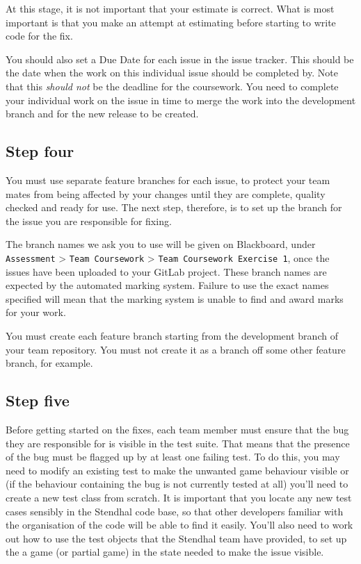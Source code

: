 \documentclass[
]{book}
\begin{document}
At this stage, it is not important that your estimate is correct. What is most important is that you make an attempt at estimating before starting to write code for the fix.

You should also set a Due Date for each issue in the issue tracker. This should be the date when the work on this individual issue should be completed by. Note that this \emph{should not} be the deadline for the coursework. You need to complete your individual work on the issue in time to merge the work into the development branch and for the new release to be created.

\hypertarget{stepfour}{%
\subsection{Step four}\label{stepfour}}

You must use separate feature branches for each issue, to protect your team mates from being affected by your changes until they are complete, quality checked and ready for use. The next step, therefore, is to set up the branch for the issue you are responsible for fixing.

The branch names we ask you to use will be given on Blackboard, under \texttt{Assessment} \textgreater{} \texttt{Team\ Coursework} \textgreater{} \texttt{Team\ Coursework\ Exercise\ 1}, once the issues have been uploaded to your GitLab project. These branch names are expected by the automated marking system. Failure to use the exact names specified will mean that the marking system is unable to find and award marks for your work.

You must create each feature branch starting from the development branch of your team repository. You must not create it as a branch off some other feature branch, for example.

\hypertarget{stepfive}{%
\subsection{Step five}\label{stepfive}}

Before getting started on the fixes, each team member must ensure that the bug they are responsible for is visible in the test suite. That means that the presence of the bug must be flagged up by at least one failing test. To do this, you may need to modify an existing test to make the unwanted game behaviour visible or (if the behaviour containing the bug is not currently tested at all) you'll need to create a new test class from scratch. It is important that you locate any new test cases sensibly in the Stendhal code base, so that other developers familiar with the organisation of the code will be able to find it easily. You'll also need to work out how to use the test objects that the Stendhal team have provided, to set up the a game (or partial game) in the state needed to make the issue visible.
\end{document}

